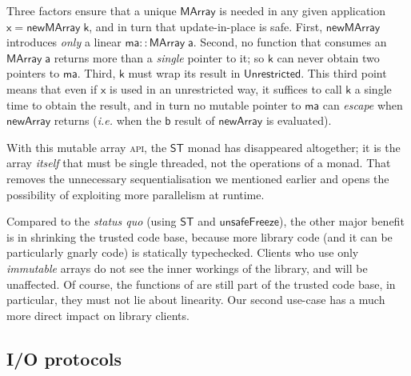 \documentclass[acmsmall,screen]{acmart}\settopmatter{}
\newcommand{\Conid}[1]{\mathit{#1}}
\newcommand{\Varid}[1]{\mathit{#1}}
\renewcommand\Varid[1]{\mathord{\textsf{#1}}}
\renewcommand\Conid[1]{\mathord{\textsf{#1}}}
\newcommand{\ie}{\textit{i.e.}\xspace}
\begin{document}
Three factors ensure that a unique \ensuremath{\Conid{MArray}} is needed
in any given application \ensuremath{\Varid{x}\mathrel{=}\Varid{newMArray}\;\Varid{k}}, and in turn that
update-in-place is safe. First, \ensuremath{\Varid{newMArray}} introduces {\em only}
a linear \ensuremath{\Varid{ma}\mathbin{::}\Conid{MArray}\;\Varid{a}}.  Second, no function that
consumes an \ensuremath{\Conid{MArray}\;\Varid{a}} returns more than a {\em single} pointer to it;
so \ensuremath{\Varid{k}} can never obtain two pointers to \ensuremath{\Varid{ma}}.  Third, \ensuremath{\Varid{k}} must wrap its
result in \ensuremath{\Conid{Unrestricted}}. This third point means that even if \ensuremath{\Varid{x}} is used in an
unrestricted way, it suffices to call \ensuremath{\Varid{k}} a single time to obtain the
result, and in turn no mutable pointer to \ensuremath{\Varid{ma}} can {\em escape} when
\ensuremath{\Varid{newArray}} returns (\ie{} when the \ensuremath{\Varid{b}} result of \ensuremath{\Varid{newArray}} is
evaluated).

With this mutable array \textsc{api},
the \ensuremath{\Conid{ST}} monad has disappeared altogether; it is the array \emph{itself}
that must be single threaded, not the operations of a monad. That removes
the unnecessary sequentialisation we mentioned earlier and opens the
possibility of exploiting more parallelism at runtime.

Compared to the \textit{status quo} (using \ensuremath{\Conid{ST}} and \ensuremath{\Varid{unsafeFreeze}}), the
other major benefit
is in shrinking the trusted code base, because more library code (and it
can be particularly gnarly code) is statically typechecked.  Clients who
use only {\em immutable} arrays do not see the inner workings of the library, and will
be unaffected. Of course, the functions of
 are still part of the trusted code base,
in particular, they must not lie about linearity. Our second use-case has a much more direct impact on library clients.


\subsection{I/O protocols} \label{sec:io-protocols}
\end{document}
